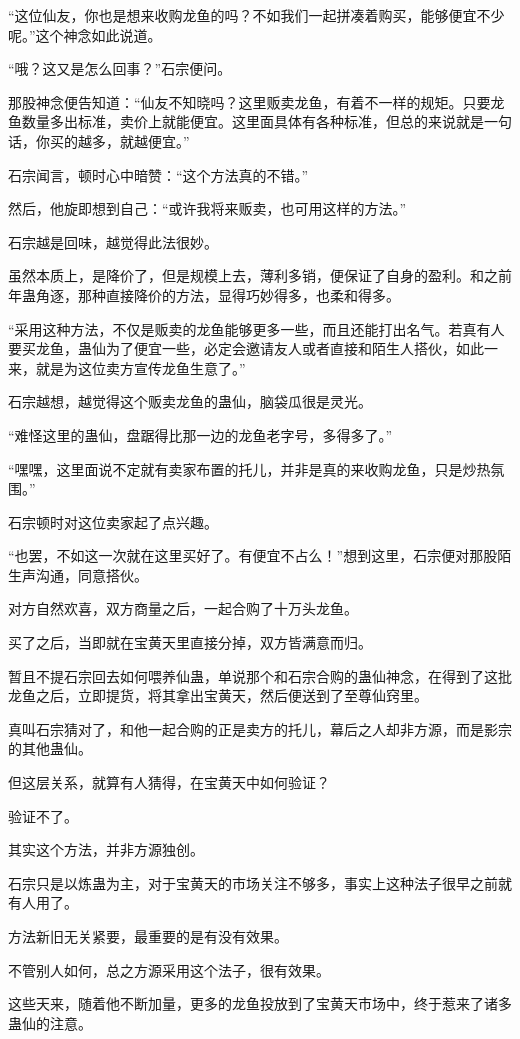 \begin{this_body}
“这位仙友，你也是想来收购龙鱼的吗？不如我们一起拼凑着购买，能够便宜不少呢。”这个神念如此说道。

“哦？这又是怎么回事？”石宗便问。

那股神念便告知道：“仙友不知晓吗？这里贩卖龙鱼，有着不一样的规矩。只要龙鱼数量多出标准，卖价上就能便宜。这里面具体有各种标准，但总的来说就是一句话，你买的越多，就越便宜。”

石宗闻言，顿时心中暗赞：“这个方法真的不错。”

然后，他旋即想到自己：“或许我将来贩卖，也可用这样的方法。”

石宗越是回味，越觉得此法很妙。

虽然本质上，是降价了，但是规模上去，薄利多销，便保证了自身的盈利。和之前年蛊角逐，那种直接降价的方法，显得巧妙得多，也柔和得多。

“采用这种方法，不仅是贩卖的龙鱼能够更多一些，而且还能打出名气。若真有人要买龙鱼，蛊仙为了便宜一些，必定会邀请友人或者直接和陌生人搭伙，如此一来，就是为这位卖方宣传龙鱼生意了。”

石宗越想，越觉得这个贩卖龙鱼的蛊仙，脑袋瓜很是灵光。

“难怪这里的蛊仙，盘踞得比那一边的龙鱼老字号，多得多了。”

“嘿嘿，这里面说不定就有卖家布置的托儿，并非是真的来收购龙鱼，只是炒热氛围。”

石宗顿时对这位卖家起了点兴趣。

“也罢，不如这一次就在这里买好了。有便宜不占么！”想到这里，石宗便对那股陌生声沟通，同意搭伙。

对方自然欢喜，双方商量之后，一起合购了十万头龙鱼。

买了之后，当即就在宝黄天里直接分掉，双方皆满意而归。

暂且不提石宗回去如何喂养仙蛊，单说那个和石宗合购的蛊仙神念，在得到了这批龙鱼之后，立即提货，将其拿出宝黄天，然后便送到了至尊仙窍里。

真叫石宗猜对了，和他一起合购的正是卖方的托儿，幕后之人却非方源，而是影宗的其他蛊仙。

但这层关系，就算有人猜得，在宝黄天中如何验证？

验证不了。

其实这个方法，并非方源独创。

石宗只是以炼蛊为主，对于宝黄天的市场关注不够多，事实上这种法子很早之前就有人用了。

方法新旧无关紧要，最重要的是有没有效果。

不管别人如何，总之方源采用这个法子，很有效果。

这些天来，随着他不断加量，更多的龙鱼投放到了宝黄天市场中，终于惹来了诸多蛊仙的注意。


\end{this_body}
